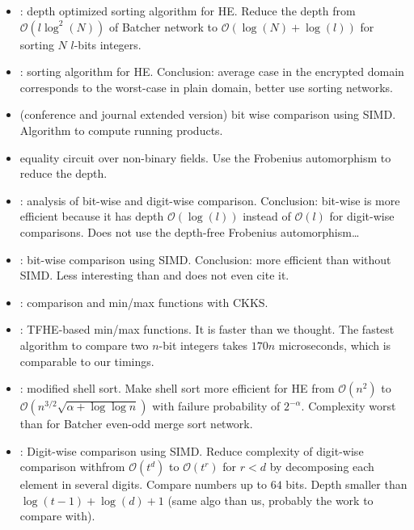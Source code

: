 \begin{itemize}
\item \cite{CDSS15}: depth optimized sorting algorithm for HE. Reduce the depth from $\mathcal{O}(l\log^2(N))$ of Batcher network to $\mathcal{O}(\log(N) + \log(l))$ for sorting $N$ $l$-bits integers.

\item \cite{EGNS15}: sorting algorithm for HE. Conclusion: average case in the encrypted domain corresponds to the worst-case in plain domain, better use sorting networks.

\item \cite{CKK15,CKK16} (conference and journal extended version) bit wise comparison using SIMD. Algorithm to compute running products.

\item \cite{KLLW18} equality circuit over non-binary fields. Use the Frobenius automorphism to reduce the depth. 
  
\item \cite{NGEG17}: analysis of bit-wise and digit-wise comparison. Conclusion: bit-wise is more efficient because it has depth $\mathcal{O}(\log(l))$ instead of $\mathcal{O}(l)$ for digit-wise comparisons. Does not use the depth-free Frobenius automorphism\dots

\item \cite{JS19}: bit-wise comparison using SIMD. Conclusion: more efficient than without SIMD. Less interesting than \cite{CKK15} and does not even cite it.

\item \cite{AC:CKKLL19,EPRINT:CheKimKim19}: comparison and min/max functions with CKKS.

\item \cite{AC:CGGI17}: TFHE-based min/max functions. It is faster than we thought. The fastest algorithm to compare two $n$-bit integers takes $170n$ microseconds, which is comparable to our timings.
 
\item \cite{LKN19}: modified shell sort. Make shell sort more efficient for HE from $\mathcal{O}(n^2)$ to $\mathcal{O}(n^{3/2}\sqrt{\alpha+\log\log n})$ with failure probability of $2^{-\alpha}$. Complexity worst than for Batcher even-odd merge sort network.

\item \cite{TLWRK20}: Digit-wise comparison using SIMD. Reduce complexity of digit-wise comparison withfrom $\mathcal{O}(t^{d})$ to $\mathcal{O}(t^{r})$ for $r < d$ by decomposing each element in several digits. Compare numbers up to $64$ bits. Depth smaller than $\log(t-1) + \log(d) + 1$ (same algo than us, probably the work to compare with).


\end{itemize}
